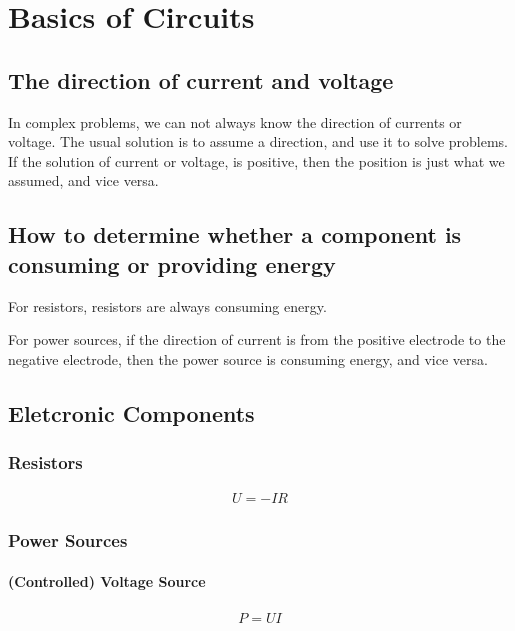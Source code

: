 \chapter{Basics of Circuits}

\section{The direction of current and voltage}

In complex problems, we can not always know the direction of currents or voltage. The usual solution is to assume a direction, and use it to solve problems. If the solution of current or voltage, is positive, then the position is just what we assumed, and vice versa.

\section{How to determine whether a component is consuming or providing energy}

For resistors, resistors are always consuming energy.

For power sources, if the direction of current is from the positive electrode to the negative electrode, then the power source is consuming energy, and vice versa.

\section{Eletcronic Components}

\subsection{Resistors}

\begin{equation*}
  \begin{aligned}
    U = - I R
  \end{aligned}
\end{equation*}

\subsection{Power Sources}

\subsubsection{(Controlled) Voltage Source}

\begin{equation*}
  \begin{aligned}
    P = U I
  \end{aligned}
\end{equation*}

